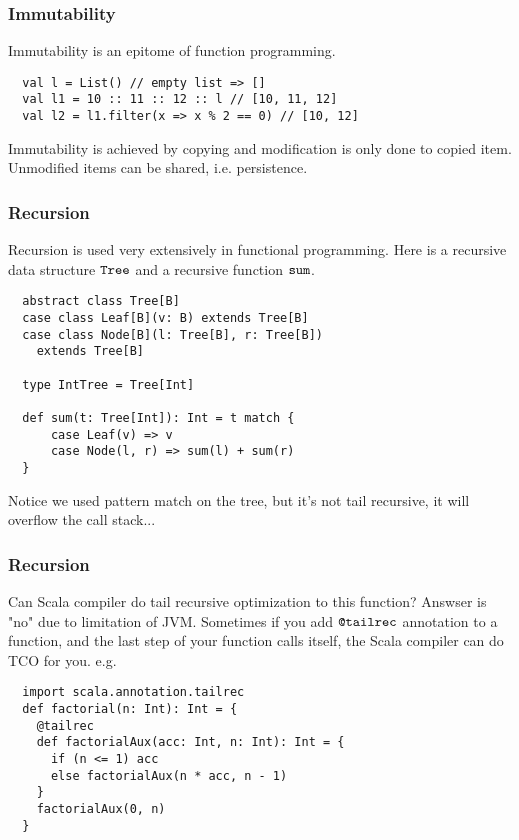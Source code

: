 \documentclass[handout]{beamer}
\begin{document}
\begin{frame}[fragile]
  \frametitle{Immutability}
  Immutability is an epitome of function programming.
  \begin{verbatim}
  val l = List() // empty list => []
  val l1 = 10 :: 11 :: 12 :: l // [10, 11, 12] 
  val l2 = l1.filter(x => x % 2 == 0) // [10, 12]
  \end{verbatim}
  Immutability is achieved by copying and modification is only done to copied item. Unmodified items can be shared, i.e. persistence.
\end{frame}

\begin{frame}[fragile]
  \frametitle{Recursion}
  Recursion is used very extensively in functional programming. Here is a recursive data structure $\verb|Tree|$ and a recursive function $\verb|sum|$.
  \begin{verbatim}
  abstract class Tree[B]
  case class Leaf[B](v: B) extends Tree[B]
  case class Node[B](l: Tree[B], r: Tree[B])
    extends Tree[B]

  type IntTree = Tree[Int]
  
  def sum(t: Tree[Int]): Int = t match {
      case Leaf(v) => v
      case Node(l, r) => sum(l) + sum(r)
  }
  \end{verbatim}
  Notice we used pattern match on the tree, but it's not tail recursive, it will overflow the call stack...
\end{frame}

\begin{frame}[fragile]
  \frametitle{Recursion}
  Can Scala compiler do tail recursive optimization to this function? Answser is "no" due to limitation of JVM.
  Sometimes if you add $\verb|@tailrec|$ annotation to a function, and the last step of your function calls itself, the Scala compiler can do TCO for you. e.g.
  \begin{verbatim}
  import scala.annotation.tailrec
  def factorial(n: Int): Int = {
    @tailrec
    def factorialAux(acc: Int, n: Int): Int = {
      if (n <= 1) acc
      else factorialAux(n * acc, n - 1)
    }
    factorialAux(0, n)
  }
  \end{verbatim}
\end{frame}
\end{document}
